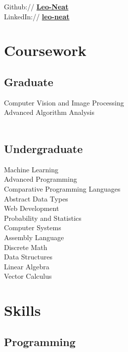 \documentclass[letterpaper]{deedy-resume} %
\begin{document}
\begin{minipage}[t]{0.33\textwidth}
Github:// \href{https://github.com/Leo-Neat}{\bf Leo-Neat} \\
LinkedIn:// \href{https://www.linkedin.com/in/leo-neat-82b34b130/}{\bf leo-neat} \\

\sectionspace %
\fi

\section{Coursework}

\subsection{Graduate}

Computer Vision and Image Processing \\
Advanced Algorithm Analysis \\\
\subsection{Undergraduate}

Machine Learning \\
Advanced Programming \\
Comparative Programming Languages \\
Abstract Data Types \\
Web Development \\
Probability and Statistics \\
Computer Systems \\
Assembly Language \\
Discrete Math \\
Data Structures \\
Linear Algebra \\
Vector Calculus \\


\sectionspace %


\section{Skills}

\subsection{Programming}


\end{minipage}
\end{document}
